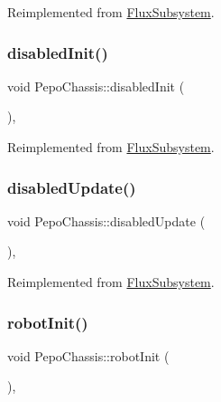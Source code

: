 Reimplemented from \hyperlink{classFluxSubsystem_aceed900af22503022b8d1278f3693f77}{Flux\+Subsystem}.

\mbox{\label{classPepoChassis_af5f6848de51ac4c47cbf2f9f706b1485}} 
\subsubsection{\texorpdfstring{disabled\+Init()}{disabledInit()}}
{\footnotesize\ttfamily void Pepo\+Chassis\+::disabled\+Init (\begin{DoxyParamCaption}{ }\end{DoxyParamCaption})\hspace{0.3cm}{\ttfamily [override]}, {\ttfamily [virtual]}}



Reimplemented from \hyperlink{classFluxSubsystem_aa0b8fde8aa5094627d15d24e545e1da4}{Flux\+Subsystem}.

\mbox{\label{classPepoChassis_a33af04df9c2396d6197f3298172763d9}} 
\subsubsection{\texorpdfstring{disabled\+Update()}{disabledUpdate()}}
{\footnotesize\ttfamily void Pepo\+Chassis\+::disabled\+Update (\begin{DoxyParamCaption}{ }\end{DoxyParamCaption})\hspace{0.3cm}{\ttfamily [override]}, {\ttfamily [virtual]}}



Reimplemented from \hyperlink{classFluxSubsystem_a5c39cb0f0834cc77a2b8f4f47778da87}{Flux\+Subsystem}.

\mbox{\label{classPepoChassis_a18dd25fff35cf7ccac6b710e329873e6}} 
\subsubsection{\texorpdfstring{robot\+Init()}{robotInit()}}
{\footnotesize\ttfamily void Pepo\+Chassis\+::robot\+Init (\begin{DoxyParamCaption}{ }\end{DoxyParamCaption})\hspace{0.3cm}{\ttfamily [override]}, {\ttfamily [virtual]}}



